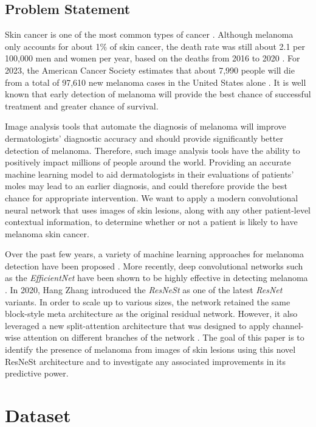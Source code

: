 \documentclass [MAS] {uclathes}
\begin{document}
\section{Problem Statement}

Skin cancer is one of the most common types of cancer \cite{CDC}. Although melanoma only accounts for about 1\% of skin cancer, the death rate was still about 2.1 per 100,000 men and women per year, based on the deaths from 2016 to 2020 \cite{SEER}. For 2023, the American Cancer Society estimates that about 7,990 people will die from a total of 97,610 new melanoma cases in the United States alone \cite{ACS}. It is well known that early detection of melanoma will provide the best chance of successful treatment and greater chance of survival. 

Image analysis tools that automate the diagnosis of melanoma will improve dermatologists' diagnostic accuracy and should provide significantly better detection of melanoma. Therefore, such image analysis tools have the ability to positively impact millions of people around the world. Providing an accurate machine learning model to aid dermatologists in their evaluations of patients' moles may lead to an earlier diagnosis, and could therefore provide the best chance for appropriate intervention. We want to apply a modern convolutional neural network that uses images of skin lesions, along with any other patient-level contextual information, to determine whether or not a patient is likely to have melanoma skin cancer.

Over the past few years, a variety of machine learning approaches for melanoma detection have been proposed \cite{VariousMethods}. More recently, deep convolutional networks such as the \textit{EfficientNet} have been shown to be highly effective in detecting melanoma \cite{EffNet_MelDet}. In 2020, Hang Zhang introduced the \textit{ResNeSt} as one of the latest \textit{ResNet} variants. In order to scale up to various sizes, the network retained the same block-style meta architecture as the original residual network. However, it also leveraged a new split-attention architecture that was designed to apply channel-wise attention on different branches of the network \cite{resnest}. The goal of this paper is to identify the presence of melanoma from images of skin lesions using this novel ResNeSt architecture and to investigate any associated improvements in its predictive power. 

\chapter{Dataset}
\end{document}

